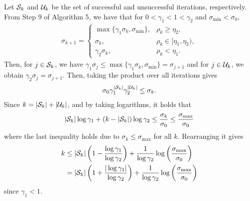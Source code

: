 \documentclass{ExerciseSheet}
\begin{document}
\begin{solution}
    Let ${\mathcal S}_k$ and ${\mathcal U}_k$ be the set of successful and unsuccessful iterations, respectively. From Step 9 of Algorithm 5, we have that for $0<\gamma_1<1<\gamma_2$ and $\sigma_{\min}<\sigma_0$, 
    \begin{align*}
        \sigma_{k+1}=\begin{cases}
            \max\{\gamma_1\sigma_k, \sigma_{\min} \}, & \rho_k\geq\eta_2,\\
            \sigma_k, & \rho_k \in [\eta_1,\eta_2),\\
            \gamma_2 \sigma_k, & \rho_k<\eta_1.
        \end{cases}
    \end{align*}
    Then, for $j\in{\mathcal S}_k$, we have $\gamma_1\sigma_j \leq \max\{\gamma_1\sigma_k, \sigma_{\min}\}=\sigma_{j+1}$ and for $j\in{\mathcal U}_k$, we obtain $\gamma_2\sigma_j = \sigma_{j+1}$. Then, taking the product over all iterations gives 
    \begin{align}
        \sigma_0\gamma_1^{|{\mathcal S}_k|}\gamma_2^{|{\mathcal U}_k|}\leq \sigma_k. \label{eq: lower bound of sigma}
    \end{align}
    Since $k=|{\mathcal S}_k|+|{\mathcal U}_k|$, and by taking logarithms, it holds that 
    \begin{align*}
        |{\mathcal S}_k| \log\gamma_1 + (k-|{\mathcal S}_k|)\log \gamma_2 \leq \frac{\sigma_k}{\sigma_0}\leq \frac{\sigma_{\max}}{\sigma_0}
    \end{align*}
    where the last inequality holds due to $\sigma_k \leq \sigma_{\max}$ for all $k$. Rearranging it gives
    \begin{align*}
        k &\leq |{\mathcal S}_k| \left(1-\frac{\log\gamma_1}{\log\gamma_2}\right)+\frac{1}{\log\gamma_2}\log\left(\frac{\sigma_{\max}}{\sigma_0}\right)\\
        & =|{\mathcal S}_k| \left(1+\frac{|\log\gamma_1|}{\log\gamma_2}\right)+\frac{1}{\log\gamma_2}\log\left(\frac{\sigma_{\max}}{\sigma_0}\right)
    \end{align*}
    since $\gamma_1<1$. 


\end{solution}
\end{document}

